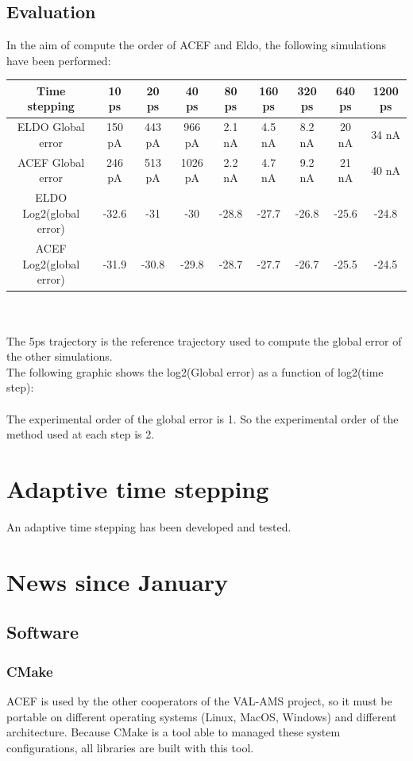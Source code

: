 \subsection{Evaluation}
In the aim of compute the order of ACEF and Eldo, the following simulations have been performed:\\
\begin{tabular}{|c|c|c|c|c|c|c|c|c|}
\hline
Time stepping & 10 ps & 20 ps & 40 ps & 80 ps & 160 ps & 320 ps & 640 ps & 1200 ps \\
\hline
ELDO Global error & 150 pA & 443 pA & 966 pA & 2.1 nA & 4.5 nA & 8.2 nA & 20 nA & 34 nA \\
\hline
ACEF Global error & 246 pA & 513 pA & 1026 pA & 2.2 nA & 4.7 nA & 9.2 nA & 21 nA & 40 nA \\
\hline
ELDO Log2(global error)& -32.6 & -31 & -30 & -28.8  & -27.7 & -26.8 & -25.6 & -24.8 \\
\hline
ACEF Log2(global error)& -31.9 & -30.8 & -29.8 & -28.7  & -27.7 & -26.7 & -25.5 & -24.5 \\
\hline
\end{tabular}\\
\\
The 5ps trajectory is the reference trajectory used to compute the global error of the other
simulations. \\The following graphic shows the log2(Global error) as a function of log2(time
step):\\
\\
The experimental order of the global error is 1. So the experimental order of the method used at
each step is 2.\\
\newpage
\section{Adaptive time stepping}
An adaptive time stepping has been developed and tested. 
\section{News since January}

\subsection{Software}

\subsubsection{CMake}
ACEF is used by the other cooperators of the VAL-AMS project, so it must be portable on different operating systems (Linux, MacOS, Windows) and
different architecture. Because CMake is a tool able to managed these system configurations, all
libraries are built with this tool.

